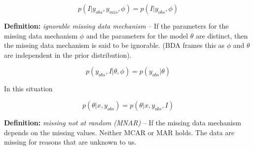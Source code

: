 \documentclass[11pt]{article}
\begin{document}
$$p(I|y_{obs}, y_{mis}, \phi) = p(I|y_{obs}, \phi)$$

\vspace{0.25in}

\textbf{Definition:} \textit{ignorable missing data mechanism} -- If the parameters for the missing data mechanism $\phi$ and the parameters for the model $\theta$ are distinct, then the missing data mechanism is said to be ignorable. (BDA frames this as $\phi$ and $\theta$ are independent in the prior distribution). 

$$p(y_{obs},I|\theta, \phi) = p(y_{obs}|\theta)$$

In this situation

$$p(\theta|x, y_{obs}) = p(\theta|x, y_{obs}, I)$$

\vspace{0.25in}

\textbf{Definition:} \textit{missing not at random (MNAR)} -- If the missing data mechanism depends on the missing values. Neither MCAR or MAR holds. The data are missing for reasons that are unknown to us. 



\end{document}
